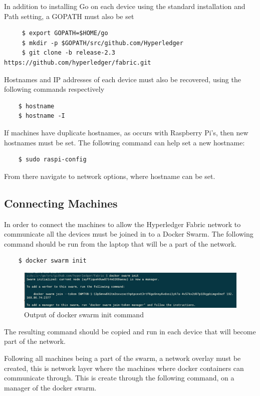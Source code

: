 In addition to installing Go on each device using the standard installation and Path setting, a GOPATH must also be set
\begin{verbatim}
     $ export GOPATH=$HOME/go
     $ mkdir -p $GOPATH/src/github.com/Hyperledger
     $ git clone -b release-2.3 https://github.com/hyperledger/fabric.git
\end{verbatim} 

Hostnames and IP addresses of each device must also be recovered, using the following commands respectively
\begin{verbatim}
    $ hostname
    $ hostname -I
\end{verbatim}
If machines have duplicate hostnames, as occurs with Raspberry Pi's, then new hostnames must be set. The following command can help set a new hostname:
\begin{verbatim}
    $ sudo raspi-config
\end{verbatim}
From there navigate to network options, where hostname can be set. 


\subsection{Connecting Machines}

In order to connect the machines to allow the Hyperledger Fabric network to communicate all the devices must be joined in to a Docker Swarm. The following command should be run from the laptop that will be a part of the network.

\begin{verbatim}
    $ docker swarm init
\end{verbatim}
\begin{figure}[h]
    \centering
    \includegraphics{images/docker swarm.png}
    \caption{Output of docker swarm init command}
    \label{fig:my_label}
\end{figure}

The resulting command should be copied and run in each device that will become part of the network.

Following all machines being a part of the swarm, a network overlay must be created, this is network layer where the machines where docker containers can communicate through. This is create through the following command, on a manager of the docker swarm.

